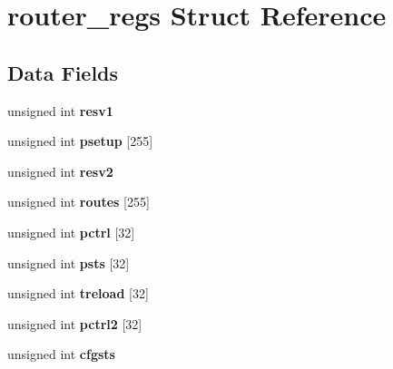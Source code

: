 \hypertarget{structrouter__regs}{}\section{router\+\_\+regs Struct Reference}
\label{structrouter__regs}
\subsection*{Data Fields}
\begin{DoxyCompactItemize}
\item 
\mbox{\label{structrouter__regs_aae2a042f199af839b5774a3f56b5521e}} 
unsigned int {\bfseries resv1}
\item 
\mbox{\label{structrouter__regs_a0cebe4d3fc4fb4a1004b1442f534175b}} 
unsigned int {\bfseries psetup} \mbox{[}255\mbox{]}
\item 
\mbox{\label{structrouter__regs_ac4dee8a89661c3006cb78db0c3fd96ed}} 
unsigned int {\bfseries resv2}
\item 
\mbox{\label{structrouter__regs_a59624c9a9a653de1c9c6668a9ec679b3}} 
unsigned int {\bfseries routes} \mbox{[}255\mbox{]}
\item 
\mbox{\label{structrouter__regs_a4a0699bbcf51da03a51161e978e9c083}} 
unsigned int {\bfseries pctrl} \mbox{[}32\mbox{]}
\item 
\mbox{\label{structrouter__regs_a534be039fedd97cad534ab422d0f201b}} 
unsigned int {\bfseries psts} \mbox{[}32\mbox{]}
\item 
\mbox{\label{structrouter__regs_a4251b045b1614dcdf17c27a995c3c33d}} 
unsigned int {\bfseries treload} \mbox{[}32\mbox{]}
\item 
\mbox{\label{structrouter__regs_a8b8f220026de17830cfbf778f817ee6d}} 
unsigned int {\bfseries pctrl2} \mbox{[}32\mbox{]}
\item 
\mbox{\label{structrouter__regs_a93406aba56f0fab553b7268307b8e815}} 
unsigned int {\bfseries cfgsts}
\item 

\end{DoxyCompactItemize}
